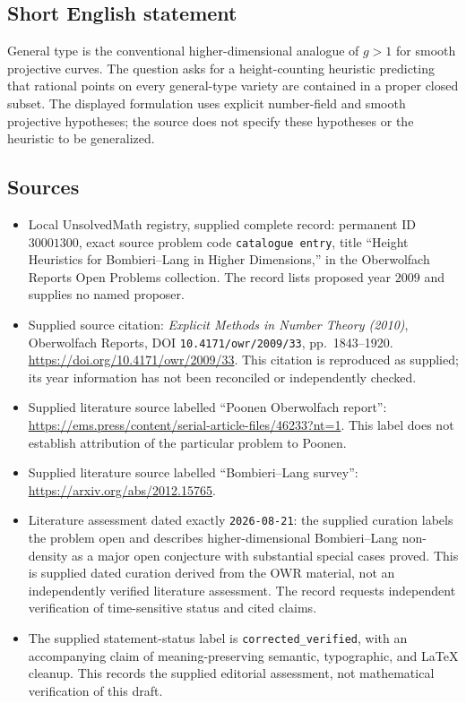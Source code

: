 \documentclass[11pt]{article}
\begin{document}
\subsection{Short English statement}
General type is the conventional higher-dimensional analogue of \(g>1\) for smooth projective curves. The question asks for a height-counting heuristic predicting that rational points on every general-type variety are contained in a proper closed subset. The displayed formulation uses explicit number-field and smooth projective hypotheses; the source does not specify these hypotheses or the heuristic to be generalized.
\subsection{Sources}
\begin{itemize}
\item Local UnsolvedMath registry, supplied complete record: permanent ID \(30001300\), exact source problem code \texttt{catalogue entry}, title ``Height Heuristics for Bombieri--Lang in Higher Dimensions,'' in the Oberwolfach Reports Open Problems collection. The record lists proposed year \(2009\) and supplies no named proposer.
\item Supplied source citation: \emph{Explicit Methods in Number Theory (2010)}, Oberwolfach Reports, DOI \texttt{10.4171/owr/2009/33}, pp.~1843--1920. \url{https://doi.org/10.4171/owr/2009/33}. This citation is reproduced as supplied; its year information has not been reconciled or independently checked.
\item Supplied literature source labelled ``Poonen Oberwolfach report'': \url{https://ems.press/content/serial-article-files/46233?nt=1}. This label does not establish attribution of the particular problem to Poonen.
\item Supplied literature source labelled ``Bombieri--Lang survey'': \url{https://arxiv.org/abs/2012.15765}.
\item Literature assessment dated exactly \texttt{2026-08-21}: the supplied curation labels the problem open and describes higher-dimensional Bombieri--Lang non-density as a major open conjecture with substantial special cases proved. This is supplied dated curation derived from the OWR material, not an independently verified literature assessment. The record requests independent verification of time-sensitive status and cited claims.
\item The supplied statement-status label is \texttt{corrected\_verified}, with an accompanying claim of meaning-preserving semantic, typographic, and LaTeX cleanup. This records the supplied editorial assessment, not mathematical verification of this draft.
\end{itemize}
\end{document}
